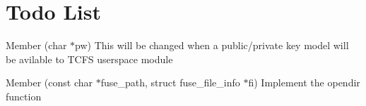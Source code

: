 \chapter{Todo List}
\hypertarget{todo}{}\label{todo}

\begin{DoxyRefList}
\item[Member \doxylink{tcfs__helper__tools_8c_a1bef5d2cdd74c07b3ae025c6424dfbd5}{get\+\_\+pass} (char \texorpdfstring{$\ast$}{*}pw)]\label{todo__todo000001}%
%
This will be changed when a public/private key model will be avilable to TCFS userspace module  
\item[Member \doxylink{tcfs_8c_a92ebab5be45b159c2850a47a5072b58d}{tcfs\+\_\+opendir} (const char \texorpdfstring{$\ast$}{*}fuse\+\_\+path, struct fuse\+\_\+file\+\_\+info \texorpdfstring{$\ast$}{*}fi)]\label{todo__todo000002}%
%
Implement the opendir function 
\end{DoxyRefList}